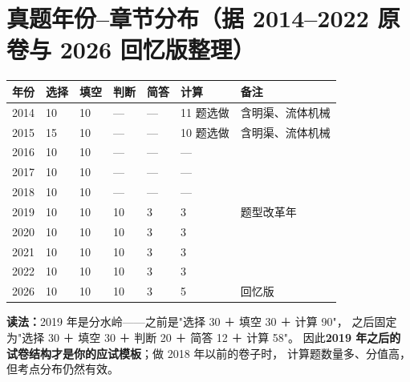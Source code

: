 \section{真题年份--章节分布（据 2014--2022 原卷与 2026 回忆版整理）}

\begin{center}
\begin{tabularx}{\textwidth}{@{}lXXXXXX@{}}
\toprule
年份 & 选择 & 填空 & 判断 & 简答 & 计算 & 备注 \\
\midrule
2014 & 10 & 10 & --- & --- & 11 题选做 & 含明渠、流体机械 \\
2015 & 15 & 10 & --- & --- & 10 题选做 & 含明渠、流体机械 \\
2016 & 10 & 10 & --- & --- & --- & \\
2017 & 10 & 10 & --- & --- & --- & \\
2018 & 10 & 10 & --- & --- & --- & \\
2019 & 10 & 10 & 10 & 3 & 3 & 题型改革年 \\
2020 & 10 & 10 & 10 & 3 & 3 & \\
2021 & 10 & 10 & 10 & 3 & 3 & \\
2022 & 10 & 10 & 10 & 3 & 3 & \\
2026 & 10 & 10 & 10 & 3 & 5 & 回忆版 \\
\bottomrule
\end{tabularx}
\end{center}

\noindent\textbf{读法：}2019 年是分水岭——之前是"选择 30 ＋ 填空 30 ＋ 计算 90"，
之后固定为"选择 30 ＋ 填空 30 ＋ 判断 20 ＋ 简答 12 ＋ 计算 58"。
因此\textbf{2019 年之后的试卷结构才是你的应试模板}；做 2018 年以前的卷子时，
计算题数量多、分值高，但考点分布仍然有效。
